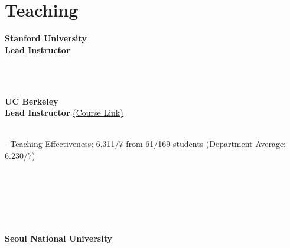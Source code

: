 \section*{Teaching}
\begin{cvcontent}
\noindent \textbf{\color{hlcolor-0} Stanford University}\\[0.5mm]
  \small{\color{hlcolor-0}} \textbf{Lead Instructor}
  \\ [0.5mm]
  \begin{itemize*}
    \item {}\\
  \end{itemize*}\\[2mm]
\noindent \textbf{\color{hlcolor-0} UC Berkeley}\\[0.5mm]
  \small{\color{hlcolor-0}} \textbf{Lead Instructor }\href{https://classes.berkeley.edu/content/2022-Fall-GEOG-C188-001-LEC-001} { (Course Link)} \hfill{\emph{\color{hlcolor-1}{}}}
  \\ [0.5mm]
  \begin{itemize*}
    \item {}\\
    - Teaching Effectiveness: 6.311/7 from 61/169 students (Department Average: 6.230/7)
  \end{itemize*}\\[2mm]
  \\ [0.5mm]
  \begin{itemize*}
    \item {} 
    \\
    \item {}  
  \end{itemize*}
  \\ [3mm]
\noindent \textbf{\color{hlcolor-0} Seoul National University}\\[0.5mm]
  \\[0.5mm]

\end{cvcontent}

